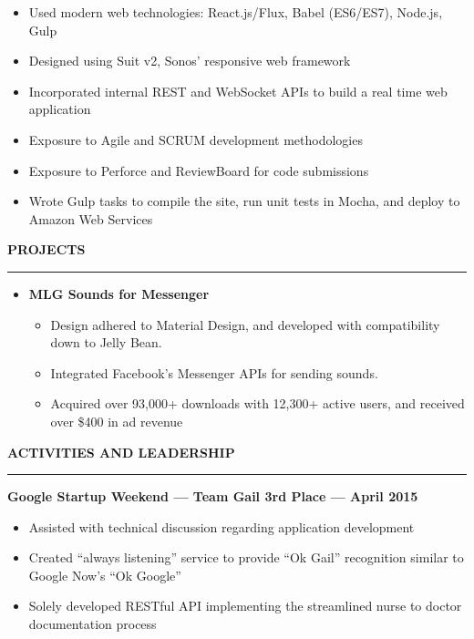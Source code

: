 \documentclass[10pt, oneside]{letter}
\newcommand{\linespaceshit} {
    \vspace{0.05in}
    \hrule
    \vspace{0.05in}
}
\begin{document}
\begin{adjustwidth}{0.1in}{0pt}
\begin{itemize}
\begin{itemize}
                            \item Used modern web technologies: React.js/Flux, Babel (ES6/ES7), Node.js, Gulp
                            \item Designed using Suit v2, Sonos' responsive web framework
                            \item Incorporated internal REST and WebSocket APIs to build a real time web application
                            \item Exposure to Agile and SCRUM development methodologies
                            \item Exposure to Perforce and ReviewBoard for code submissions
                            \item Wrote Gulp tasks to compile the site, run unit tests in Mocha, and deploy to Amazon Web Services
                        \end{itemize}
            \end{itemize}

        \end{adjustwidth}

    \textbf{PROJECTS}
    \linespaceshit{}
        \begin{adjustwidth}{0.2in}{0pt}
            \begin{itemize}
                \item \textbf{MLG Sounds for Messenger}
                    \begin{itemize}
                        \item Design adhered to Material Design, and developed with compatibility down to Jelly Bean.
                        \item Integrated Facebook's Messenger APIs for sending sounds.
                        \item Acquired over 93,000+ downloads with 12,300+ active users, and received over \$400 in ad revenue
                    \end{itemize}

            \end{itemize}
        \end{adjustwidth}

    \textbf{ACTIVITIES AND LEADERSHIP}
    \linespaceshit{}
        \textbf{Google Startup Weekend --- Team Gail 3rd Place --- April 2015}
        \begin{adjustwidth}{0.2in}{0pt}
            \begin{itemize}
                \item Assisted with technical discussion regarding application development
                \item Created ``always listening'' service to provide ``Ok Gail'' recognition similar to Google Now's ``Ok Google''
                \item Solely developed RESTful API implementing the streamlined nurse to doctor documentation process
            \end{itemize}
        \end{adjustwidth}
\end{document}
